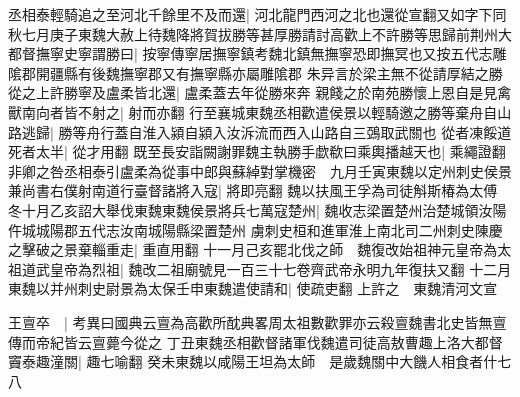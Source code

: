 丞相泰輕騎追之至河北千餘里不及而還|{
	河北龍門西河之北也還從宣翻又如字下同}
秋七月庚子東魏大赦上待魏降將賀拔勝等甚厚勝請討高歡上不許勝等思歸前荆州大都督撫寧史寧謂勝曰|{
	按寧傳寧居撫寧鎮考魏北鎮無撫寧恐即撫冥也又按五代志雕隂郡開疆縣有後魏撫寧郡又有撫寧縣亦屬雕隂郡}
朱异言於梁主無不從請厚結之勝從之上許勝寧及盧柔皆北還|{
	盧柔蓋去年從勝來奔}
親餞之於南苑勝懷上恩自是見禽獸南向者皆不射之|{
	射而亦翻}
行至襄城東魏丞相歡遣侯景以輕騎邀之勝等棄舟自山路逃歸|{
	勝等舟行蓋自淮入潁自潁入汝泝流而西入山路自三鵶取武關也}
從者凍餒道死者太半|{
	從才用翻}
既至長安詣闕謝罪魏主執勝手歔欷曰乘輿播越天也|{
	乘繩證翻}
非卿之咎丞相泰引盧柔為從事中郎與蘇綽對掌機密　九月壬寅東魏以定州刺史侯景兼尚書右僕射南道行臺督諸將入寇|{
	將即亮翻}
魏以扶風王孚為司徒斛斯椿為太傅　冬十月乙亥詔大舉伐東魏東魏侯景將兵七萬寇楚州|{
	魏收志梁置楚州治楚城領汝陽仵城城陽郡五代志汝南城陽縣梁置楚州}
虜刺史桓和進軍淮上南北司二州刺史陳慶之擊破之景棄輜重走|{
	重直用翻}
十一月己亥罷北伐之師　魏復改始祖神元皇帝為太祖道武皇帝為烈祖|{
	魏改二祖廟號見一百三十七卷齊武帝永明九年復扶又翻}
十二月東魏以并州刺史尉景為太保壬申東魏遣使請和|{
	使疏吏翻}
上許之　東魏清河文宣

王亶卒　|{
	考異曰國典云亶為高歡所酖典畧周太祖數歡罪亦云殺亶魏書北史皆無亶傳而帝紀皆云亶薨今從之}
丁丑東魏丞相歡督諸軍伐魏遣司徒高敖曹趣上洛大都督竇泰趣潼關|{
	趣七喻翻}
癸未東魏以咸陽王坦為太師　是歲魏關中大饑人相食者什七八

